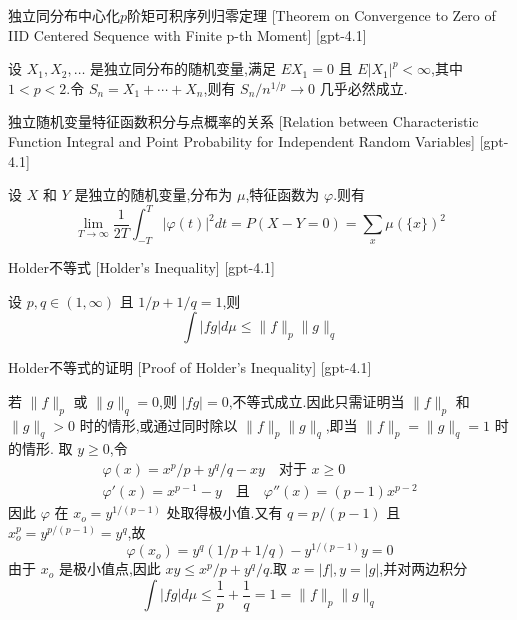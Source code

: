 \documentclass[UTF8]{ctexart}
\begin{document}
    
    
    \begin{thm}
        {独立同分布中心化$p$阶矩可积序列归零定理}
        [Theorem on Convergence to Zero of IID Centered Sequence with Finite p-th Moment]
        [gpt-4.1]
        
设 $X_{1}, X_{2}, \dots$ 是独立同分布的随机变量,满足 $E X_{1} = 0$ 且 $E |X_{1}|^{p} < \infty$,其中 $1 < p < 2$.令 $S_{n} = X_{1} + \cdots + X_{n}$,则有 $S_{n} / n^{1/p} \to 0$ 几乎必然成立.

    \end{thm}
    
    
    
    \begin{thm}
        {独立随机变量特征函数积分与点概率的关系}
        [Relation between Characteristic Function Integral and Point Probability for Independent Random Variables]
        [gpt-4.1]
        
设 $X$ 和 $Y$ 是独立的随机变量,分布为 $\mu$,特征函数为 $\varphi$.则有
\[
\lim _ { T \to \infty } {\frac { 1 } { 2 T }} \int _ { - T } ^ { T } | \varphi ( t ) | ^ { 2 } d t = P ( X - Y = 0 ) = \sum _ { x } \mu ( \{ x \} ) ^ { 2 }
\]

    \end{thm}
    
    
    
    \begin{thm}
        {Holder不等式}
        [Holder's Inequality]
        [gpt-4.1]
        
设 $p, q \in (1, \infty)$ 且 $1/p + 1/q = 1$,则
\[
\int |f g| d\mu \leq \|f\|_{p} \|g\|_{q}
\]

    \end{thm}
    
    
    
    \begin{prf}
        {Holder不等式的证明}
        [Proof of Holder's Inequality]
        [gpt-4.1]
        
若 $\| f \|_{p}$ 或 $\| g \|_{q} = 0$,则 $|fg| = 0$,不等式成立.因此只需证明当 $\| f \|_{p}$ 和 $\| g \|_{q} > 0$ 时的情形,或通过同时除以 $\| f \|_{p} \| g \|_{q}$,即当 $\| f \|_{p} = \| g \|_{q} = 1$ 时的情形.
取 $y \ge 0$,令
\[
\begin{array}{l}
\varphi(x) = x^{p}/p + y^{q}/q - x y \quad \text{对于 } x \geq 0 \\
\varphi'(x) = x^{p-1} - y \quad \text{且} \quad \varphi''(x) = (p-1)x^{p-2}
\end{array}
\]
因此 $\varphi$ 在 $x_{o} = y^{1/(p-1)}$ 处取得极小值.又有 $q = p/(p-1)$ 且 $x_{o}^{p} = y^{p/(p-1)} = y^{q}$,故
\[
\varphi(x_{o}) = y^{q} (1/p + 1/q) - y^{1/(p-1)} y = 0
\]
由于 $x_{o}$ 是极小值点,因此 $x y \leq x^{p}/p + y^{q}/q$.取 $x = |f|, y = |g|$,并对两边积分
\[
\int |f g| d\mu \leq \frac{1}{p} + \frac{1}{q} = 1 = \|f\|_{p} \|g\|_{q}
\]

    \end{prf}
    
\end{document}
